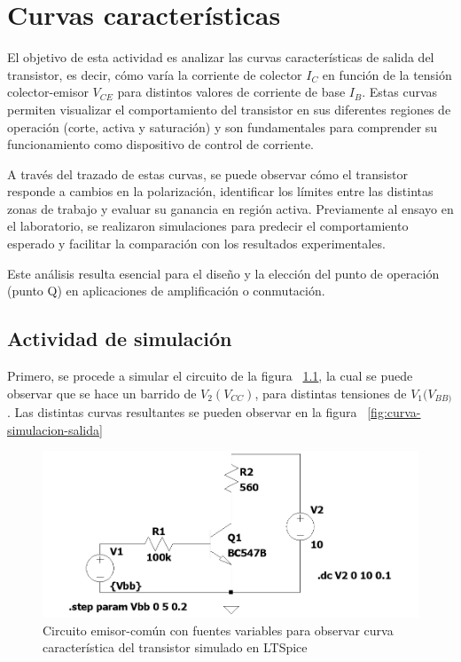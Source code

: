\documentclass[chaptersright]{informeutn}
\begin{document}
\chapter{Curvas características}
El objetivo de esta actividad es analizar las curvas características de salida del transistor, es decir, cómo varía la corriente de colector $I_C$ en función de la tensión colector-emisor $V_{CE}$ para distintos valores de corriente de base $I_B$. Estas curvas permiten visualizar el comportamiento del transistor en sus diferentes regiones de operación (corte, activa y saturación) y son fundamentales para comprender su funcionamiento como dispositivo de control de corriente.

A través del trazado de estas curvas, se puede observar cómo el transistor responde a cambios en la polarización, identificar los límites entre las distintas zonas de trabajo y evaluar su ganancia en región activa. Previamente al ensayo en el laboratorio, se realizaron simulaciones para predecir el comportamiento esperado y facilitar la comparación con los resultados experimentales.

Este análisis resulta esencial para el diseño y la elección del punto de operación (punto Q) en aplicaciones de amplificación o conmutación.

  \section{Actividad de simulación}
  Primero, se procede a simular el circuito de la figura 
  ~\ref{fig:circuito-simulacion-salida}, la cual se puede observar que se hace
  un barrido de $V_2(V_{CC})$, para distintas tensiones de $V_1(V_{BB)}$. Las
  distintas curvas resultantes se pueden observar en la figura ~\ref{fig:curva-simulacion-salida}
      \begin{figure}[H]
          \centering
          \includegraphics[width=1\textwidth, keepaspectratio]{pictures/circuito-simulacion-salida.png}
          \caption{Circuito emisor-común con fuentes variables para observar curva característica del transistor simulado en LTSpice}
          \label{fig:circuito-simulacion-salida}
      \end{figure}
  
\end{document}
